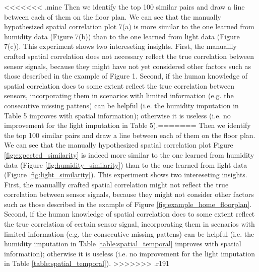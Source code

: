 <<<<<<< .mine
Then we identify the top 100 similar pairs and draw a line between each of them on the floor plan. We can see that the manually hypothesized spatial correlation plot 7(a) is more similar to the one learned from humidity data (Figure 7(b)) than to the one learned from light data (Figure 7(c)). This experiment shows two intereseting insights. First, the manuallly crafted spatial correlation does not necessary reflect the true correlation between sensor signals, because they might have not yet considered other factors such as those described in the example of Figure 1. Second, if the human knowledge of spatial correlation does to some extent reflect the true correlation between sensors, incorporating them in scenarios with limited information (e.g. the consecutive missing pattens) can be helpful (i.e. the humidity imputation in Table 5 improves with spatial information); otherwise it is useless (i.e. no improvement for the light imputation in Table 5).=======
Then we identify the top 100 similar pairs and draw a line between each of them on the floor plan. We can see that the manually hypothesized spatial correlation plot Figure \ref{fig:expected_similarity} is indeed more similar to the one learned from humidity data (Figure \ref{fig:humidity_similarity}) than to the one learned from light data (Figure \ref{fig:light_similarity}). This experiment shows two intereseting insights. First, the manuallly crafted spatial correlation might not reflect the true correlation between sensor signals, because they might not consider other factors such as those described in the example of Figure \ref{fig:example_home_floorplan}. Second, if the human knowledge of spatial correlation does to some extent reflect the true correlation of certain sensor signal, incorporating them in scenarios with limited information (e.g. the consecutive missing pattens) can be helpful (i.e. the humidity imputation in Table \ref{table:spatial_temporal} improves with spatial information); otherwise it is useless (i.e. no improvement for the light imputation in Table \ref{table:spatial_temporal}).
>>>>>>> .r191
